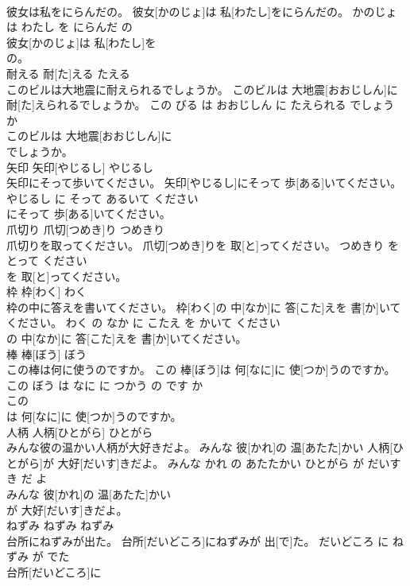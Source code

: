 \documentclass[8pt]{extreport}
\begin{document}
\begin{CJK}{UTF8}{min}
\\	彼女は私をにらんだの。	彼女[かのじょ]は 私[わたし]をにらんだの。	かのじょ は わたし を にらんだ の	
\\	彼女[かのじょ]は 私[わたし]を
\\	の。			
\\	耐える	耐[た]える	たえる	
\\	このビルは大地震に耐えられるでしょうか。	このビルは 大地震[おおじしん]に 耐[た]えられるでしょうか。	この びる は おおじしん に たえられる でしょう か	
\\	このビルは 大地震[おおじしん]に
\\	でしょうか。			
\\	矢印	矢印[やじるし]	やじるし	
\\	矢印にそって歩いてください。	矢印[やじるし]にそって 歩[ある]いてください。	やじるし に そって あるいて ください	
\\	にそって 歩[ある]いてください。			
\\	爪切り	爪切[つめき]り	つめきり	
\\	爪切りを取ってください。	爪切[つめき]りを 取[と]ってください。	つめきり を とって ください	
\\	を 取[と]ってください。			
\\	枠	枠[わく]	わく	
\\	枠の中に答えを書いてください。	枠[わく]の 中[なか]に 答[こた]えを 書[か]いてください。	わく の なか に こたえ を かいて ください	
\\	の 中[なか]に 答[こた]えを 書[か]いてください。			
\\	棒	棒[ぼう]	ぼう	
\\	この棒は何に使うのですか。	この 棒[ぼう]は 何[なに]に 使[つか]うのですか。	この ぼう は なに に つかう の です か	
\\	この
\\	は 何[なに]に 使[つか]うのですか。			
\\	人柄	人柄[ひとがら]	ひとがら	
\\	みんな彼の温かい人柄が大好きだよ。	みんな 彼[かれ]の 温[あたた]かい 人柄[ひとがら]が 大好[だいす]きだよ。	みんな かれ の あたたかい ひとがら が だいすき だ よ	
\\	みんな 彼[かれ]の 温[あたた]かい
\\	が 大好[だいす]きだよ。			
\\	ねずみ	ねずみ	ねずみ	
\\	台所にねずみが出た。	台所[だいどころ]にねずみが 出[で]た。	だいどころ に ねずみ が でた	
\\	台所[だいどころ]に

\end{CJK}
\end{document}
